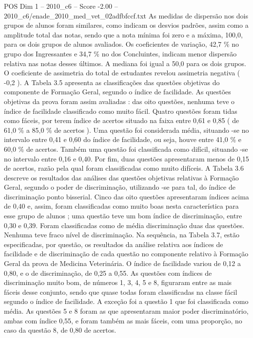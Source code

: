 \begin{textsample}{POS Dim 1 – 2010\_c6 – Score -2.00 – 2010\_c6/enade\_2010\_med\_vet\_02adfbfccf.txt}
As medidas de dispersão nos dois grupos de alunos foram similares, como indicam os desvios padrões, assim como a amplitude total das notas, sendo que a nota mínima foi zero e a máxima, 100,0, para os dois grupos de alunos avaliados.
Os coeficientes de variação, 42,7 \% no grupo dos Ingressantes e 34,7 \% no dos Concluintes, indicam menor dispersão relativa nas notas desses últimos.
A mediana foi igual a 50,0 para os dois grupos.
O coeficiente de assimetria do total de estudantes revelou assimetria negativa ( -0,2 ).
A Tabela 3.5 apresenta as classificações das questões objetivas do componente de Formação Geral, segundo o índice de facilidade.
As questões objetivas da prova foram assim avaliadas : das oito questões, nenhuma teve o índice de facilidade classificado como muito fácil.
Quatro questões foram tidas como fáceis, por terem índice de acertos situado na faixa entre 0,61 e 0,85 ( de 61,0 \% a 85,0 \% de acertos ).
Uma questão foi considerada média, situando -se no intervalo entre 0,41 e 0,60 do índice de facilidade, ou seja, houve entre 41,0 \% e 60,0 \% de acertos.
Também uma questão foi classificada como difícil, situando -se no intervalo entre 0,16 e 0,40.
Por fim, duas questões apresentaram menos de 0,15 de acertos, razão pela qual foram classificadas como muito difíceis.
A Tabela 3.6 descreve os resultados das análises das questões objetivas relativas à Formação Geral, segundo o poder de discriminação, utilizando -se para tal, do índice de discriminação ponto bisserial.
Cinco das oito questões apresentaram índices acima de 0,40 e, assim, foram classificadas como muito boas nesta característica para esse grupo de alunos ; uma questão teve um bom índice de discriminação, entre 0,30 e 0,39.
Foram classificadas como de média discriminação duas das questões.
Nenhuma teve fraco nível de discriminação.
Na sequência, na Tabela 3.7, estão especificadas, por questão, os resultados da análise relativa aos índices de facilidade e de discriminação de cada questão no componente relativo à Formação Geral da prova de Medicina Veterinária.
O índice de facilidade variou de 0,12 a 0,80, e o de discriminação, de 0,25 a 0,55.
As questões com índices de discriminação muito bom, de números 1, 3, 4, 5 e 8, figuraram entre as mais fáceis desse conjunto, sendo que quase todas foram classificadas na classe fácil segundo o índice de facilidade.
A exceção foi a questão 1 que foi classificada como média.
As questões 5 e 8 foram as que apresentaram maior poder discriminatório, ambas com índice 0,55, e foram também as mais fáceis, com uma proporção, no caso da questão 8, de 0,80 de acertos.

\end{textsample}
